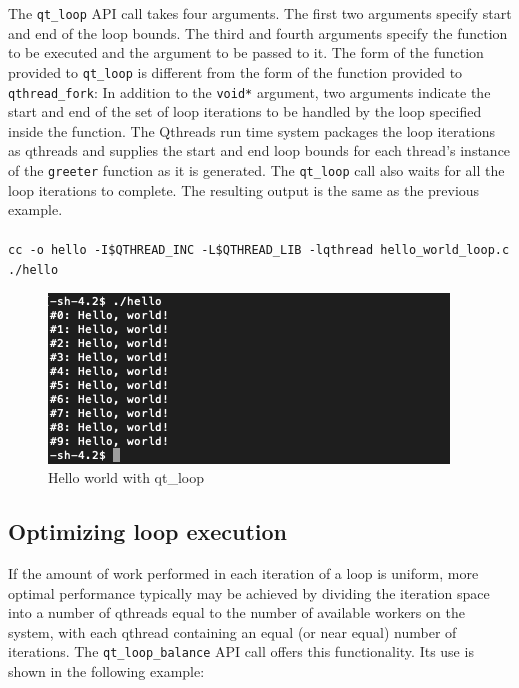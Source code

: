 \documentclass[12pt,fullpage]{article}
\begin{document}
The {\tt qt\_loop} API call takes four arguments.  The first two arguments specify start and end of the loop bounds.  The third and fourth arguments specify the function to be executed and the argument to be passed to it.  The form of the function provided to {\tt qt\_loop} is different from the form of the function provided to {\tt qthread\_fork}:  In addition to the {\tt void*} argument, two arguments indicate the start and end of the set of loop iterations to be handled by the loop specified inside the function.  The Qthreads run time system packages the loop iterations as qthreads and supplies the start and end loop bounds for each thread's instance of the {\tt greeter} function as it is generated.  The {\tt qt\_loop} call also waits for all the loop iterations to complete.  The resulting output is the same as the previous example.
\\ \\
{\footnotesize{\tt cc -o hello -I\$QTHREAD\_INC -L\$QTHREAD\_LIB -lqthread hello\_world\_loop.c}}
\\
{\footnotesize{\tt ./hello}}
\begin{figure}[h]
\includegraphics[scale=0.7]{hello_world_qt_loop.png}
\caption{Hello world with qt\_loop}
\label{fig:hello_world_qt_loop}
\end{figure}

\subsection{Optimizing loop execution}

If the amount of work performed in each iteration of a loop is uniform, more optimal performance typically may be achieved by dividing the iteration space into a number of qthreads equal to the number of available workers on the system, with each qthread containing an equal (or near equal) number of iterations.  The {\tt qt\_loop\_balance} API call offers this functionality.  Its use is shown in the following example:
\\

\end{document}
